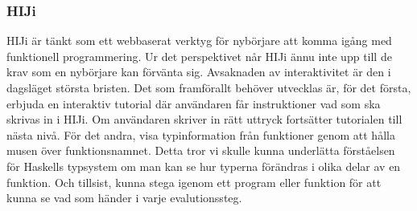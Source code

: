 \subsubsection{HIJi}
HIJi är tänkt som ett webbaserat verktyg för nybörjare att komma igång med funktionell programmering. Ur det perspektivet når HIJi ännu inte upp till de krav som en nybörjare kan förvänta sig. Avsaknaden av interaktivitet  är den i dagsläget största bristen.
Det som framförallt behöver utvecklas är, för det första, erbjuda en interaktiv tutorial där användaren får instruktioner vad som ska skrivas in i HIJi. Om användaren skriver in rätt uttryck fortsätter tutorialen till nästa nivå.
För det andra, visa typinformation från funktioner genom att hålla musen över funktionsnamnet. Detta tror vi skulle kunna underlätta förståelsen för Haskells typsystem om man kan se hur typerna förändras i olika delar av en funktion. 
Och tillsist, kunna stega igenom ett program eller funktion för att kunna se vad som händer i varje evalutionssteg. 
